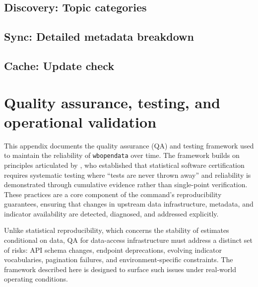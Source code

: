 \documentclass[bib]{statapress}
\begin{document}
\subsection{Discovery: Topic categories}\label{app:diagnostics:alltopics}
\begin{stlog}
\nullskip
\end{stlog}

\subsection{Sync: Detailed metadata breakdown}\label{app:diagnostics:sync}
\begin{stlog}
\nullskip
\end{stlog}

\subsection{Cache: Update check}\label{app:diagnostics:checkupdate}
\begin{stlog}
\nullskip
\end{stlog}

\section{Quality assurance, testing, and operational validation}\label{app:qa}

This appendix documents the quality assurance (QA) and testing framework used
to maintain the reliability of \texttt{wbopendata} over time. The framework
builds on principles articulated by \citet{gould2001certification}, who
established that statistical software certification requires systematic testing
where ``tests are never thrown away'' and reliability is demonstrated through
cumulative evidence rather than single-point verification. These practices
are a core component of the command's reproducibility guarantees, ensuring that
changes in upstream data infrastructure, metadata, and indicator availability
are detected, diagnosed, and addressed explicitly.

Unlike statistical reproducibility, which concerns the stability of estimates
conditional on data, QA for data-access infrastructure must address a distinct
set of risks: API schema changes, endpoint deprecations, evolving indicator
vocabularies, pagination failures, and environment-specific constraints. The
framework described here is designed to surface such issues under real-world
operating conditions.
\end{document}
